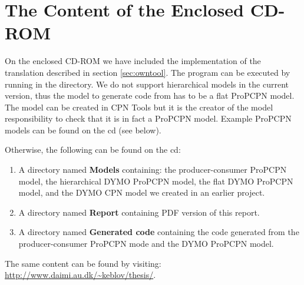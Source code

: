 \chapter{The Content of the Enclosed CD-ROM}
\label{appsec:cd}

On the enclosed CD-ROM we have included the implementation of the translation described in section \ref{sec:owntool}. The program can be executed by running  in the  directory. We do not support hierarchical models in the current version, thus the model to generate code from has to be a flat ProPCPN model. The model can be created in CPN Tools but it is the creator of the model responsibility to check that it is in fact a ProPCPN model. Example ProPCPN models can be found on the cd (see below).

Otherwise, the following can be found on the cd:

\begin{enumerate}
  \item A directory named \textbf{Models} containing: the producer-consumer ProPCPN model, the hierarchical DYMO ProPCPN model, the flat DYMO ProPCPN model, and the DYMO CPN model we created in an earlier project. 
  \item A directory named \textbf{Report} containing PDF version of this report.
  \item A directory named \textbf{Generated code} containing the code generated from the producer-consumer ProPCPN mode and the DYMO ProPCPN model.   

\end{enumerate}

\noindent The same content can be found by visiting: \newline \url{http://www.daimi.au.dk/~keblov/thesis/}.
